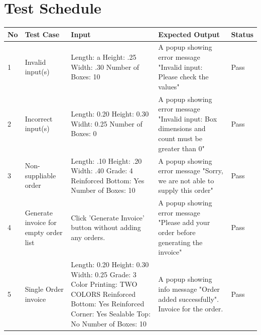 \documentclass[12pt]{article}
\begin{document}
\section{Test Schedule}
\begin{tabular}{| p{1cm} | p{4cm} | p{4cm} | p{4cm} | p{2cm} |}
	\hline
	\textbf{No} & \textbf{Test Case} & \textbf{Input} & \textbf{Expected Output} & \textbf{Status} \\ \hline
	1 & Invalid input(s) & Length: a \newline
	Height: .25 \newline
	Width: .30 \newline
	Number of Boxes: 10 & A popup showing error message "Invalid input: Please check the values" & Pass \\ \hline
	2 & Incorrect input(s) & Length: 0.20 \newline
	Height: 0.30 \newline
	Widht: 0.25 \newline
	Number of Boxes: 0 & A popup showing error message "Invalid input: Box dimensions and count must be greater than 0" & Pass \\ \hline
	3 & Non-suppliable order & Length: .10 \newline
	Height: .20 \newline
	Width: .40 \newline
	Grade: 4 \newline
	Reinforced Bottom: Yes \newline
	Number of Boxes: 10 & A popup showing error message "Sorry, we are not able to supply this order" & Pass \\ \hline
	4 & Generate invoice for empty order list & Click 'Generate Invoice' button without adding any orders. & A popup showing error message "Please add your order before generating the invoice" & Pass \\ \hline
	5 & Single Order invoice & Length: 0.20 \newline
	Height: 0.30 \newline
	Width: 0.25 \newline
	Grade: 3 \newline
	Color Printing: TWO COLORS \newline
	Reinforced Bottom: Yes \newline
	Reinforced Corner: Yes \newline
	Sealable Top: No \newline
	Number of Boxes: 10 & A popup showing info message "Order added successfully". \newline Invoice for the order. & Pass \\ \hline
\end{tabular}
\end{document}
